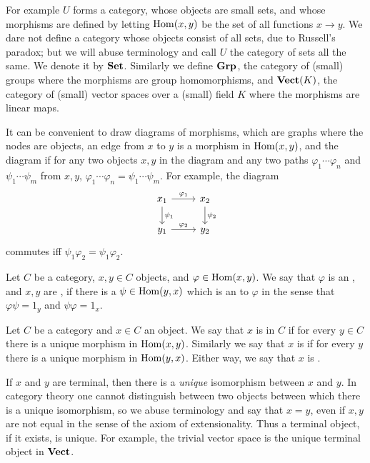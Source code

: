 For example $U$ forms a category, whose objects are small sets, and whose morphisms are defined by letting $\operatorname{Hom}(x, y)$ be the set of all functions $x \to y$.
We dare not define a category whose objects consist of all sets, due to Russell's paradox; but we will abuse terminology and call $U$ the category of sets all the same. We denote it by $\mathbf{Set}$.
Similarly we define $\mathbf{Grp}$, the category of (small) groups where the morphisms are group homomorphisms, and $\mathbf{Vect}(K)$, the category of (small) vector spaces over a (small) field $K$ where the morphisms are linear maps.

It can be convenient to draw diagrams of morphisms, which are graphs where the nodes are objects, an edge from $x$ to $y$ is a morphism in $\operatorname{Hom}(x, y)$, and the diagram  if for any two objects $x, y$ in the diagram and any two paths $\varphi_1\cdots\varphi_n$ and $\psi_1\cdots\psi_m$ from $x, y$, $\varphi_1\cdots\varphi_n = \psi_1\cdots\psi_m$.
For example, the diagram
$$\begin{tikzcd}
x_1 \arrow[r,"\varphi_1"] \arrow[d,"\psi_1"] & x_2 \arrow[d,"\psi_2"]\\
y_1 \arrow[r,"\varphi_2"] & y_2
\end{tikzcd}$$
commutes iff $\psi_1\varphi_2 = \psi_1\varphi_2$.

\begin{definition}
Let $C$ be a category, $x,y \in C$ objects, and $\varphi \in \operatorname{Hom}(x, y)$.
We say that $\varphi$ is an , and $x,y$ are , if there is a $\psi \in \operatorname{Hom}(y, x)$ which is an  to $\varphi$ in the sense that $\varphi\psi = 1_y$ and $\psi\varphi = 1_x$.
\end{definition}

\begin{definition}
Let $C$ be a category and $x \in C$ an object.
We say that $x$ is  in $C$ if for every $y \in C$ there is a unique morphism in $\operatorname{Hom}(x, y)$.
Similarly we say that $x$ is  if for every $y$ there is a unique morphism in $\operatorname{Hom}(y, x)$.
Either way, we say that $x$ is .
\end{definition}

If $x$ and $y$ are terminal, then there is a \emph{unique} isomorphism between $x$ and $y$.
In category theory one cannot distinguish between two objects between which there is a unique isomorphism, so we abuse terminology and say that $x = y$, even if $x,y$ are not equal in the sense of the axiom of extensionality.
Thus a terminal object, if it exists, is unique.
For example, the trivial vector space is the unique terminal object in $\mathbf{Vect}$.

